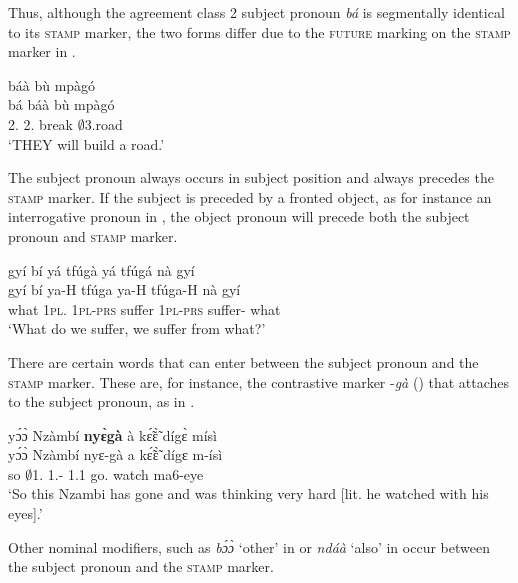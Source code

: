 \noindent Thus, although the agreement class 2 subject pronoun {\itshape bá} is segmentally identical to its \textsc{stamp} marker, the two forms differ due to the \textsc{future} marking on the \textsc{stamp} marker in .

\ea \label{SBJpro3}
   báà bù mpàgó \\
       bá báà bù mpàgó \\
        2.{\SBJ} 2.{\FUT} break $\emptyset$3.road  \\
    \trans `THEY will build a road.'
\z

The subject pronoun always occurs in subject position and always precedes the \textsc{stamp} marker. If the subject is preceded by a fronted object, as for instance an interrogative pronoun in , the object pronoun will precede both the subject pronoun and \textsc{stamp} marker.

\ea \label{SBJpro4}
  \glll     gyí bí yá tfúgà yá tfúgá nà gyí\\
             gyí bí ya-H tfúga ya-H tfúga-H nà gyí\\
              what 1\textsc{pl}.{\SBJ} 1\textsc{pl}-\textsc{prs} suffer 1\textsc{pl}-\textsc{prs} suffer-{\R} {\COM} what \\
    \trans `What do we suffer, we suffer from what?'
\z

There are certain words that can enter between the subject pronoun and the \textsc{stamp} marker. These are, for instance, the contrastive marker -{\itshape gà}  () that attaches to the subject pronoun, as in .

\ea \label{SBJpro5}
  \glll  yɔ́ɔ̀ Nzàmbí {\bfseries nyɛ̀gà} à kɛ̃́ɛ̃̀ dígɛ̀ mísì \\
         yɔ́ɔ̀ Nzàmbí nyɛ-gà a kɛ̃́ɛ̃̀ dígɛ m-ísì \\
           so $\emptyset$1.{\PN} 1.{\SBJ}-{\CONTR} 1.{\PST}1 go.{\COMPL} watch ma6-eye  \\
    \trans `So this Nzambi has gone and was thinking very hard [lit. he watched with his eyes].'
\z

\noindent Other nominal modifiers, such as {\itshape bɔ́ɔ̀} `other' in  or {\itshape ndáà}  `also' in  occur between the subject pronoun and the \textsc{stamp} marker.


